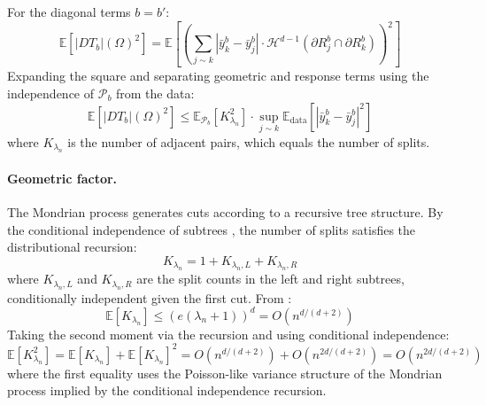 \documentclass[12pt]{article}
\newcommand{\E}{\mathbb{E}}
\begin{document}
	For the diagonal terms $b = b'$:
	\begin{equation}
		\E\!\left[|DT_b|(\Omega)^2\right]
		= \E\!\left[\left(\sum_{j \sim k} |\bar{y}_k^b - \bar{y}_j^b|
		\cdot \mathcal{H}^{d-1}(\partial R_j^b \cap \partial R_k^b)\right)^2\right]
	\end{equation}
	Expanding the square and separating geometric and response terms using the
	independence of $\mathcal{P}_b$ from the data:
	\begin{equation}
		\E\!\left[|DT_b|(\Omega)^2\right]
		\leq \mathbb{E}_{\mathcal{P}_b}\!\left[K_{\lambda_n}^2\right]
		\cdot \sup_{j \sim k} \mathbb{E}_{\mathrm{data}}\!\left[
		|\bar{y}_k^b - \bar{y}_j^b|^2\right]
	\end{equation}
	where $K_{\lambda_n}$ is the number of adjacent pairs, which equals the
	number of splits.
	
	\paragraph{Geometric factor.}
	The Mondrian process generates cuts according to a recursive tree structure.
	By the conditional independence of subtrees \citep{roy2009mondrian}, the
	number of splits satisfies the distributional recursion:
	\begin{equation}
		K_{\lambda_n} = 1 + K_{\lambda_n, L} + K_{\lambda_n, R}
	\end{equation}
	where $K_{\lambda_n, L}$ and $K_{\lambda_n, R}$ are the split counts in the
	left and right subtrees, conditionally independent given the first cut.
	From \citet{mourtada2017mondrian}:
	\begin{equation}
		\mathbb{E}[K_{\lambda_n}] \leq (e(\lambda_n + 1))^d = O(n^{d/(d+2)})
	\end{equation}
	Taking the second moment via the recursion and using conditional independence:
	\begin{equation}
		\mathbb{E}[K_{\lambda_n}^2]
		= \mathbb{E}[K_{\lambda_n}] + \mathbb{E}[K_{\lambda_n}]^2
		= O(n^{d/(d+2)}) + O(n^{2d/(d+2)})
		= O(n^{2d/(d+2)})
	\end{equation}
	where the first equality uses the Poisson-like variance structure of the
	Mondrian process implied by the conditional independence recursion.
	
\end{document}
